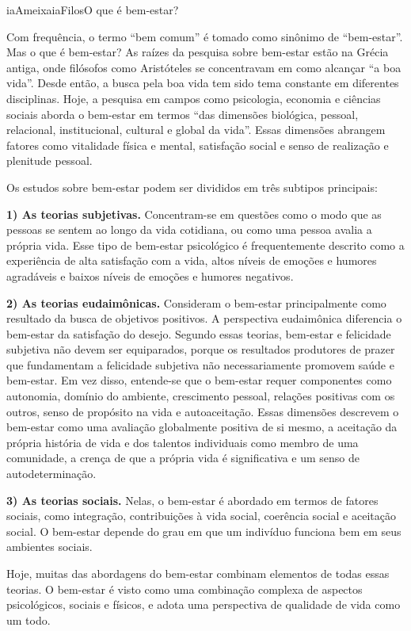 \documentclass[
  11pt,
]{article}
\newenvironment{filosofia}[1][Conceito filosofico]{\begin{iabox}{iaAmeixa}{iaFilos}{#1}}{\end{iabox}}
\begin{document}
\begin{filosofia}[O que é bem-estar?]

Com frequência, o termo ``bem comum'' é tomado como sinônimo de
``bem-estar''. Mas o que é bem-estar? As raízes da pesquisa sobre
bem-estar estão na Grécia antiga, onde filósofos como Aristóteles se
concentravam em como alcançar ``a boa vida''. Desde então, a busca pela
boa vida tem sido tema constante em diferentes disciplinas. Hoje, a
pesquisa em campos como psicologia, economia e ciências sociais aborda o
bem-estar em termos ``das dimensões biológica, pessoal, relacional,
institucional, cultural e global da vida''. Essas dimensões abrangem
fatores como vitalidade física e mental, satisfação social e senso de
realização e plenitude pessoal.

Os estudos sobre bem-estar podem ser divididos em três subtipos
principais:

\textbf{1) As teorias subjetivas.} Concentram-se em questões como o modo
que as pessoas se sentem ao longo da vida cotidiana, ou como uma pessoa
avalia a própria vida. Esse tipo de bem-estar psicológico é
frequentemente descrito como a experiência de alta satisfação com a
vida, altos níveis de emoções e humores agradáveis e baixos níveis de
emoções e humores negativos.

\textbf{2) As teorias eudaimônicas.} Consideram o bem-estar
principalmente como resultado da busca de objetivos positivos. A
perspectiva eudaimônica diferencia o bem-estar da satisfação do desejo.
Segundo essas teorias, bem-estar e felicidade subjetiva não devem ser
equiparados, porque os resultados produtores de prazer que fundamentam a
felicidade subjetiva não necessariamente promovem saúde e bem-estar. Em
vez disso, entende-se que o bem-estar requer componentes como autonomia,
domínio do ambiente, crescimento pessoal, relações positivas com os
outros, senso de propósito na vida e autoaceitação. Essas dimensões
descrevem o bem-estar como uma avaliação globalmente positiva de si
mesmo, a aceitação da própria história de vida e dos talentos
individuais como membro de uma comunidade, a crença de que a própria
vida é significativa e um senso de autodeterminação.

\textbf{3) As teorias sociais.} Nelas, o bem-estar é abordado em termos
de fatores sociais, como integração, contribuições à vida social,
coerência social e aceitação social. O bem-estar depende do grau em que
um indivíduo funciona bem em seus ambientes sociais.

Hoje, muitas das abordagens do bem-estar combinam elementos de todas
essas teorias. O bem-estar é visto como uma combinação complexa de
aspectos psicológicos, sociais e físicos, e adota uma perspectiva de
qualidade de vida como um todo.


\end{filosofia}
\end{document}
